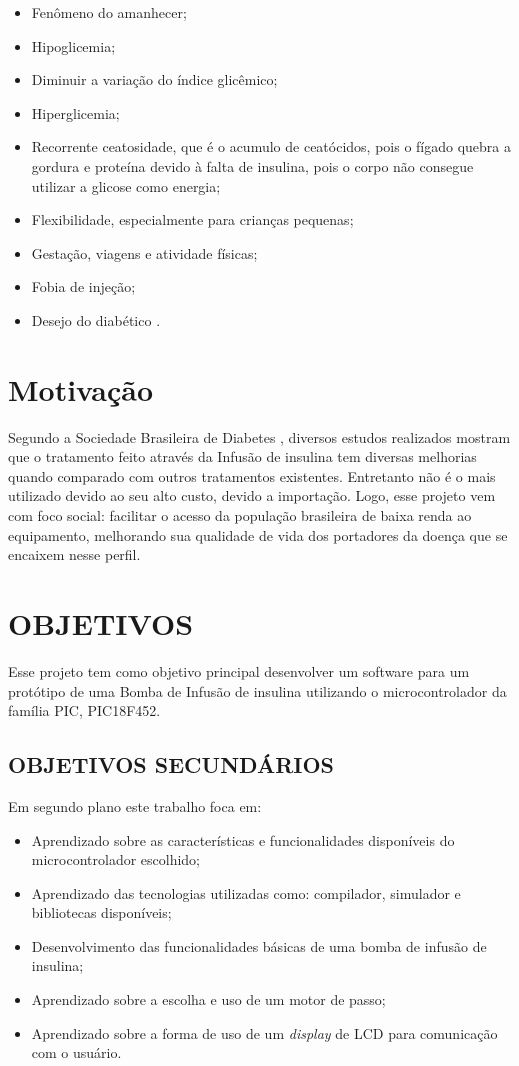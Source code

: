 \begin{itemize}
\item Fenômeno do amanhecer;
\item Hipoglicemia;
\item Diminuir a variação do índice glicêmico;
\item Hiperglicemia;
\item Recorrente ceatosidade, que é o acumulo de ceatócidos, pois o fígado quebra a gordura e proteína devido à falta de insulina, pois o corpo não consegue utilizar a glicose como energia;
\item Flexibilidade, especialmente para crianças pequenas;
\item Gestação, viagens e atividade físicas;
\item Fobia de injeção;
\item Desejo do diabético \cite{diabetes2013, portaldiabetes2009}.
\end{itemize}

\section{Motivação}
Segundo a Sociedade Brasileira de Diabetes \cite{sbc2014}, diversos estudos realizados mostram que o tratamento feito através da Infusão de insulina tem diversas melhorias quando comparado com outros tratamentos existentes. Entretanto não é o mais utilizado devido ao seu alto custo, devido a importação.
Logo, esse projeto vem com foco social: facilitar o acesso da população brasileira de baixa renda ao equipamento, melhorando sua qualidade de vida dos portadores da doença que se encaixem nesse perfil. 

\section{OBJETIVOS}
Esse projeto tem como objetivo principal desenvolver um software para um protótipo de uma Bomba de Infusão de insulina utilizando o microcontrolador da família PIC, PIC18F452. 

\subsection{OBJETIVOS SECUNDÁRIOS}

Em segundo plano este trabalho foca em:
\begin{itemize}
\item Aprendizado sobre as características e funcionalidades disponíveis do microcontrolador escolhido;
\item Aprendizado das tecnologias utilizadas como: compilador, simulador e bibliotecas disponíveis;
\item Desenvolvimento das funcionalidades básicas de uma bomba de infusão de insulina;
\item Aprendizado sobre a escolha e uso de um motor de passo;
\item Aprendizado sobre a forma de uso de um \emph{display} de LCD para comunicação com o usuário.
\end{itemize}

